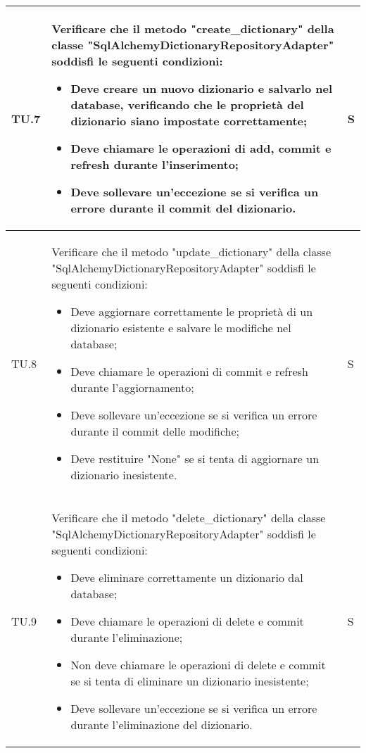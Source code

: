 \begin{adjustwidth}{-0.5cm}{-0.5cm}
\begin{longtable}{|P{1.5cm}|>{\raggedright}P{9.5cm}|>{\arraybackslash}P{1.5cm}|}
		\hline TU.7 & Verificare che il metodo "create\_dictionary" della classe "SqlAlchemyDictionaryRepositoryAdapter" soddisfi le seguenti condizioni:
		\begin{itemize}
			\item Deve creare un nuovo dizionario e salvarlo nel database, verificando che le proprietà del dizionario siano impostate correttamente;
			\item Deve chiamare le operazioni di add, commit e refresh durante l'inserimento;
			\item Deve sollevare un'eccezione se si verifica un errore durante il commit del dizionario.
		\end{itemize} & S \\

		\hline TU.8 & Verificare che il metodo "update\_dictionary" della classe "SqlAlchemyDictionaryRepositoryAdapter" soddisfi le seguenti condizioni:
		\begin{itemize}
			\item Deve aggiornare correttamente le proprietà di un dizionario esistente e salvare le modifiche nel database;
			\item Deve chiamare le operazioni di commit e refresh durante l'aggiornamento;
			\item Deve sollevare un'eccezione se si verifica un errore durante il commit delle modifiche;
			\item Deve restituire "None" se si tenta di aggiornare un dizionario inesistente.
		\end{itemize} & S \\

		\hline TU.9 & Verificare che il metodo "delete\_dictionary" della classe "SqlAlchemyDictionaryRepositoryAdapter" soddisfi le seguenti condizioni:
		\begin{itemize}
			\item Deve eliminare correttamente un dizionario dal database;
			\item Deve chiamare le operazioni di delete e commit durante l'eliminazione;
			\item Non deve chiamare le operazioni di delete e commit se si tenta di eliminare un dizionario inesistente;
			\item Deve sollevare un'eccezione se si verifica un errore durante l'eliminazione del dizionario.
		\end{itemize} & S \\


\end{longtable}
\end{adjustwidth}
